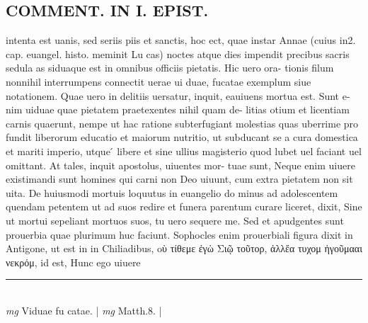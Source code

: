 \documentclass{article}
\begin{document}
\begin{pages}
\section*{COMMENT. IN I. EPIST. }\pstart intenta est uanis, sed seriis piis et sanctis, hoc ect, quae instar Annae (cuius in2. cap. euangel. histo. meminit Lu cas) noctes atque dies impendit precibus sacris sedula as siduaque est in omnibus officiis pietatis. Hic uero ora- tionis filum nonnihil interrumpens connectit uerae ui duae, fucatae exemplum siue notationem. Quae uero in delitiis uersatur, inquit, eauiuens mortua est. Sunt e- nim uiduae quae pietatem praetexentes nihil quam de- litias otium et licentiam carnis quaerunt, nempe ut hac ratione subterfugiant molestias quas uberrime pro fundit liberorum educatio et maiorum nutritio, ut subducant se a cura domestica et mariti imperio, utque ́ libere et sine ullius magisterio quod lubet uel faciant uel omittant. At tales, inquit apostolus, uiuentes mor- tuae sunt, Neque enim uiuere existimandi sunt homines qui carni non Deo uiuunt, cum extra pietatem non sit uita. De huiusmodi mortuis loquutus in euangelio do minus ad adolescentem quendam petentem ut ad suos redire et funera parentum curare liceret, dixit, Sine ut mortui sepeliant mortuos suos, tu uero sequere me. Sed et apudgentes sunt prouerbia quae plurimum huc faciunt. Sophocles enim prouerbiali figura dixit in Antigone, ut est in in Chiliadibus, oὺ τίθεμε ἐγὼ Σιῷ τοῦτορ, ἀλλἔα τυχομ ἠγοῦμααι νεκρόμ, id est, Hunc ego uiuere  \pend
\vspace{0.5cm}\noindent
\vspace{0.2cm}\rule{1cm}{0.2pt}\\ 
\hspace{0.2cm}\textit{mg}
\footnotesize Viduae fu catae. 
\normalsize| 
\hspace{0.2cm}\textit{mg}
\footnotesize Matth.8. 
\normalsize| 

\end{pages}
\end{document}
